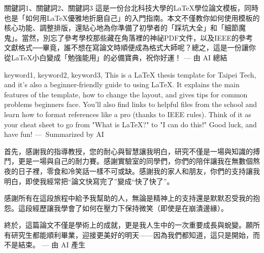 \documentclass[12pt]{report}
\theoremstyle{plain}
\renewcommand{\authorzh}{佚名}
\renewcommand{\depzh}{電子工程系}
\begin{document}
\makecoverpage %

\maketitlepage %

\checkresult{} %

\begin{init} %

\begin{abszh}{關鍵詞1、關鍵詞2、關鍵詞3}
這是一份台北科技大學的\LaTeX{}學位論文模板，同時也是「如何用\LaTeX{}優雅地折磨自己」的入門指南。本文不僅教你如何使用模板的核心功能、調整排版，還貼心地為你準備了初學者的「踩坑大全」和「細節魔鬼」。當然，別忘了參考學校那些藏在角落裡的神祕PDF文件，以及IEEE的參考文獻格式──畢竟，誰不想在寫論文時順便成為格式大師呢？總之，這是一份讓你從\LaTeX{}小白變成「勉強能用」的必備寶典，祝你好運！ --- 由 AI 總結
\end{abszh}

\begin{absen}{keyword1, keyword2, keyword3,}
This is a \LaTeX{} thesis template for Taipei Tech, and it’s also a beginner-friendly guide to using \LaTeX{}. It explains the main features of the template, how to change the layout, and gives tips for common problems beginners face. You’ll also find links to helpful files from the school and learn how to format references like a pro (thanks to IEEE rules). Think of it as your cheat sheet to go from "What is \LaTeX{}?" to "I can do this!" Good luck, and have fun! ---~Summarized by AI
\end{absen}

\begin{ack}
首先，感謝我的指導教授，您的耐心與智慧讓我明白，研究不僅是一場與知識的搏鬥，更是一場與自己的耐力賽。感謝實驗室的同學們，你們的陪伴讓我在無數個熬夜的日子裡，零食和冷笑話一樣不可或缺。感謝我的家人和朋友，你們的支持讓我明白，即使我經常把“論文快寫完了”變成“快了快了”。

感謝所有在這段旅程中給予我幫助的人，無論是精神上的支持還是默默忍受我的抱怨。這段經歷讓我學會了如何在壓力下保持微笑（即使是在崩潰邊緣）。

終於，這篇論文不僅是學術上的成就，更是我人生中的一次重要成長與蛻變。願所有研究生都能順利畢業，迎接更美好的明天——因為我們都知道，這只是開始，而不是結束。 --- 由 AI 產生
\end{ack}

\makecontentlists

\end{init}
\end{document}
